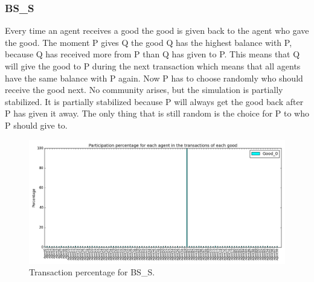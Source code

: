 \documentclass[twoside,openright]{uva-bachelor-thesis}
\begin{document}
\subsubsection{BS\_S}
Every time an agent receives a good the good is given back to the agent who gave the good. The moment P gives Q the good Q has the highest balance with P, because Q has received more from P than Q has given to P. This means that Q will give the good to P during the next transaction which means that all agents have the same balance with P again. Now P has to choose randomly who should receive the good next. No community arises, but the simulation is partially stabilized. It is partially stabilized because P will always get the good back after P has given it away. The only thing that is still random is the choice for P to who P should give to. \\
\begin{figure}[h!]
  \centering
   \includegraphics[scale=0.4]{Simulation_figures/BR_BS_S/Figure1_10k}
\caption{Transaction percentage for BS\_S.}
\end{figure}
\end{document}
